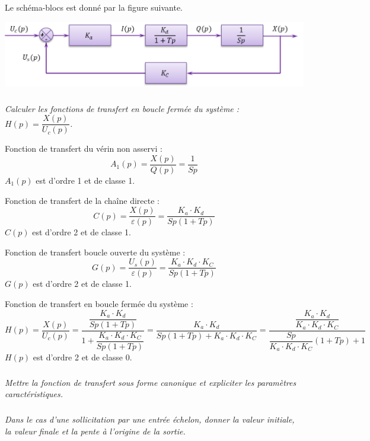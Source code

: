 \documentclass[10pt,fleqn]{article} %
\begin{document}
\begin{multicols}{2}
Le schéma-blocs est donné par la figure suivante. 
\begin{center}
\includegraphics[width=\linewidth]{images/schema_bloc}
\end{center}

\subparagraph{}
\textit{Calculer les fonctions de transfert en boucle fermée du système : $H(p)=\dfrac{X(p)}{U_c(p)}$.}
\ifprof
\begin{corrige}
Fonction de transfert du vérin non asservi : 
$$A_1(p)=\dfrac{X(p)}{Q(p)} = \dfrac{1}{Sp}$$
$A_1(p)$ est d'ordre 1 et de classe 1.

Fonction de transfert de la chaîne directe : 
$$C(p)=\dfrac{X(p)}{\varepsilon(p)}= \dfrac{K_a\cdot K_d }{Sp\left( 1+Tp\right)}$$
$C(p)$ est d'ordre 2 et de classe 1.

Fonction de transfert boucle ouverte du système : 
$$G(p)=\dfrac{U_s(p)}{\varepsilon(p)}= \dfrac{K_a\cdot K_d \cdot K_C }{Sp\left( 1+Tp\right)}$$
$G(p)$ est d'ordre 2 et de classe 1.

Fonction de transfert en boucle fermée du système : 
$$H(p)=\dfrac{X(p)}{U_c(p)}
=\dfrac{\dfrac{K_a\cdot K_d }{Sp\left( 1+Tp\right)}}{1+\dfrac{K_a\cdot K_d \cdot K_C }{Sp\left( 1+Tp\right)}}
=\dfrac{K_a\cdot K_d }{Sp\left( 1+Tp\right)+K_a\cdot K_d \cdot K_C }
=\dfrac{\dfrac{K_a\cdot K_d}{K_a\cdot K_d \cdot K_C}}{\dfrac{Sp}{K_a\cdot K_d \cdot K_C}\left( 1+Tp\right)+1 }
$$
$H(p)$ est d'ordre 2 et de classe 0.
\end{corrige}
\else \fi
%
%

\subparagraph{}
\textit{Mettre la fonction de transfert sous forme canonique et expliciter les paramètres caractéristiques.}


\subparagraph{}
\textit{Dans le cas d'une sollicitation par une entrée échelon, donner la valeur initiale, la valeur finale et la pente à l'origine de la sortie.}
\ifprof
\begin{corrige}
\end{corrige}
\else \fi


\end{multicols}
\end{document}
